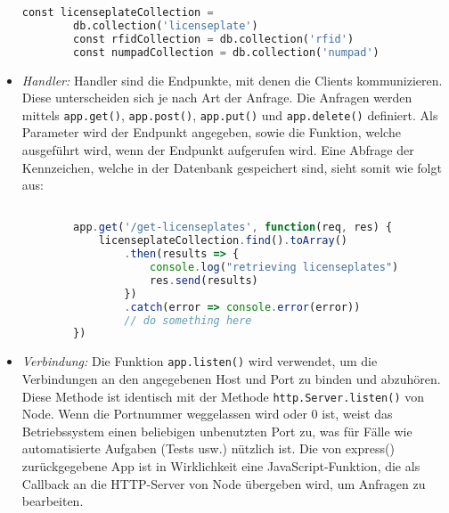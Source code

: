 \begin{itemize}
\begin{lstlisting}[language=Python, caption=Konfiguration der Datenbankanbindung, label=lst:impl:dbconf]
        const licenseplateCollection =
        db.collection('licenseplate')
        const rfidCollection = db.collection('rfid')
        const numpadCollection = db.collection('numpad')
    \end{lstlisting}
    \item \textit{Handler: } Handler sind die Endpunkte, mit denen die Clients kommunizieren. Diese unterscheiden sich je nach Art der Anfrage. Die Anfragen werden mittels \verb|app.get()|, \verb|app.post()|, \verb|app.put()| und \verb|app.delete()| definiert. Als Parameter wird der Endpunkt angegeben, sowie die Funktion, welche ausgeführt wird, wenn der Endpunkt aufgerufen wird. Eine Abfrage der Kennzeichen, welche in der Datenbank gespeichert sind, sieht somit wie folgt aus:  \begin{lstlisting}[language=JavaScript, caption=Abfrage der Kennzeichen, label=lst:impl:getlicenseplates]

        app.get('/get-licenseplates', function(req, res) {
            licenseplateCollection.find().toArray()
                .then(results => {
                    console.log("retrieving licenseplates")
                    res.send(results)
                })
                .catch(error => console.error(error))
                // do something here
        })
    \end{lstlisting}
    \item \textit{Verbindung:} Die Funktion \verb|app.listen()| wird verwendet, um die Verbindungen an den angegebenen Host und Port zu binden und abzuhören. Diese Methode ist identisch mit der Methode \verb|http.Server.listen()| von Node.
    Wenn die Portnummer weggelassen wird oder 0 ist, weist das Betriebssystem einen beliebigen unbenutzten Port zu, was für Fälle wie automatisierte Aufgaben (Tests usw.) nützlich ist.
    Die von express() zurückgegebene App ist in Wirklichkeit eine JavaScript-Funktion, die als Callback an die HTTP-Server von Node übergeben wird, um Anfragen zu bearbeiten.
    \end{itemize}
